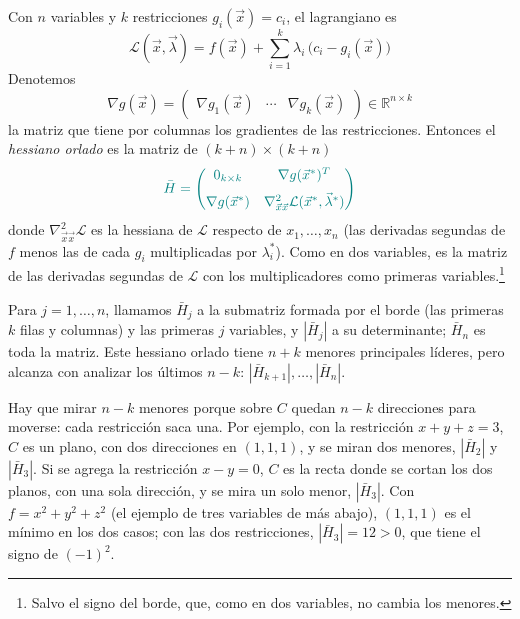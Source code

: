 \documentclass{article}
\newcommand{\R}{\ensuremath{\mathbb{R}}}
\newcommand{\vect}[1]{\vec{#1}}
\begin{document}
Con \(n\) variables y \(k\) restricciones \(g_i(\vect{x})=c_i\), el lagrangiano es
\[
\mathcal L(\vect{x},\vect{\lambda})=f(\vect{x})+\sum_{i=1}^k\lambda_i\,\bigl(c_i-g_i(\vect{x})\bigr)
\]
Denotemos
\[
\nabla g(\vect{x})
=
\begin{pmatrix}
\nabla g_1(\vect{x}) & \cdots & \nabla g_k(\vect{x})
\end{pmatrix}
\in\R^{n\times k}
\]
la matriz que tiene por columnas los gradientes de las restricciones. Entonces el \emph{hessiano orlado} es la matriz de \((k+n)\times(k+n)\)
\[\color{teal}
\bar H
=
\begin{pmatrix}
0_{k\times k} & \nabla g(\vect{x}^*)^T\\[6pt]
\nabla g(\vect{x}^*) & \nabla^2_{\vect{x}\vect{x}}\mathcal L(\vect{x}^*,\vect{\lambda}^*)
\end{pmatrix}
\]
donde \(\nabla^2_{\vect{x}\vect{x}}\mathcal L\) es la hessiana de \(\mathcal L\) respecto de \(x_1,\dots,x_n\) (las derivadas segundas de \(f\) menos las de cada \(g_i\) multiplicadas por \(\lambda_i^*\)). Como en dos variables, es la matriz de las derivadas segundas de \(\mathcal L\) con los multiplicadores como primeras variables.\footnote{Salvo el signo del borde, que, como en dos variables, no cambia los menores.}

Para \(j=1,\dots,n\), llamamos \(\bar H_j\) a la submatriz formada por el borde (las primeras \(k\) filas y columnas) y las primeras \(j\) variables, y \(|\bar H_j|\) a su determinante; \(\bar H_n\) es toda la matriz. Este hessiano orlado tiene \(n+k\) menores principales líderes, pero alcanza con analizar los últimos \(n-k\): \(|\bar H_{k+1}|,\dots,|\bar H_n|\).

Hay que mirar \(n-k\) menores porque sobre \(C\) quedan \(n-k\) direcciones para moverse: cada restricción saca una. Por ejemplo, con la restricción \(x+y+z=3\), \(C\) es un plano, con dos direcciones en \((1,1,1)\), y se miran dos menores, \(|\bar H_2|\) y \(|\bar H_3|\). Si se agrega la restricción \(x-y=0\), \(C\) es la recta donde se cortan los dos planos, con una sola dirección, y se mira un solo menor, \(|\bar H_3|\). Con \(f=x^2+y^2+z^2\) (el ejemplo de tres variables de más abajo), \((1,1,1)\) es el mínimo en los dos casos; con las dos restricciones, \(|\bar H_3|=12>0\), que tiene el signo de \((-1)^2\).
\end{document}
